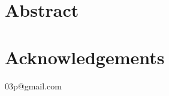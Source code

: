 \documentclass[11pt]{report}
\begin{document}
\maketitle

\chapter*{Abstract}


\vspace{2cm}

\chapter*{Acknowledgements}

\tableofcontents
\listoffiguresrashmi03p@gmail.com
\listoftables
\lstlistoflistings		%

\newpage
\setcounter{page}{0}

 

\renewcommand\bibname{References}
\printbibliography


\end{document}
